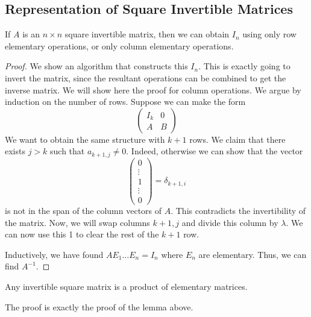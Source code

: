 \subsection{Representation of Square Invertible Matrices}
\begin{lemma}
	If \( A \) is an \( n \times n \) square invertible matrix, then we can obtain \( I_n \) using only row elementary operations, or only column elementary operations.
\end{lemma}
\begin{proof}
	We show an algorithm that constructs this \( I_n \).
	This is exactly going to invert the matrix, since the resultant operations can be combined to get the inverse matrix.
	We will show here the proof for column operations.
	We argue by induction on the number of rows.
	Suppose we can make the form
	\[
		\begin{pmatrix} I_k & 0 \\ A & B \end{pmatrix}
	\]
	We want to obtain the same structure with \( k+1 \) rows.
	We claim that there exists \( j > k \) such that \( a_{k+1,j} \neq 0 \).
	Indeed, otherwise we can show that the vector
	\[
		\begin{pmatrix} 0 \\ \vdots \\ 1 \\ \vdots \\ 0 \end{pmatrix} = \delta_{k+1,i}
	\]
	is not in the span of the column vectors of \( A \).
	This contradicts the invertibility of the matrix.
	Now, we will swap columns \( k+1, j \) and divide this column by \( \lambda \).
	We can now use this 1 to clear the rest of the \( k+1 \) row.

	Inductively, we have found \( A E_1 \dots E_n = I_n \) where \( E_n \) are elementary.
	Thus, we can find \( A^{-1} \).
\end{proof}
\begin{proposition}
	Any invertible square matrix is a product of elementary matrices.
\end{proposition}
The proof is exactly the proof of the lemma above.
